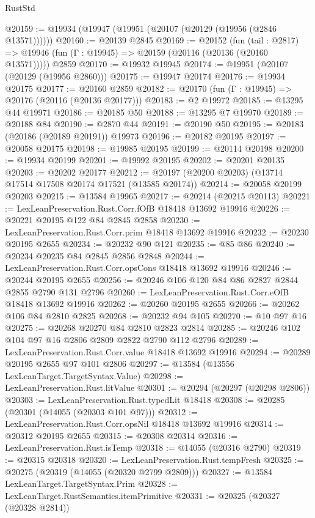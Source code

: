 \begin{lexlean}{RustStd}
\begin{coremodule}
@20159 := @19934 (@19947 (@19951 (@20107 (@20129 (@19956 (@2846 @13571))))))
@20160 := @20139 @2845
@20169 := @20152
    (fun (tail : @2817) => @19946 (fun (Γ : @19945) => @20159 (@20116 (@20136 (@20160 @13571)))))
    @2859
@20170 := @19932 @19945
@20174 := @19951 (@20107 (@20129 (@19956 @2860)))
@20175 := @19947 @20174
@20176 := @19934 @20175
@20177 := @20160 @2859
@20182 := @20170 (fun (Γ : @19945) => @20176 (@20116 (@20136 @20177)))
@20183 := @2 @19972
@20185 := @13295 @44 @19971
@20186 := @20185 @50
@20188 := @13295 @7 @19970
@20189 := @20188 @84
@20190 := @2870 @44
@20191 := @20190 @50
@20195 := @20183 (@20186 (@20189 @20191)) @19973
@20196 := @20182 @20195
@20197 := @20058 @20175
@20198 := @19985 @20195
@20199 := @20114 @20198
@20200 := @19934 @20199
@20201 := @19992 @20195
@20202 := @20201 @20135
@20203 := @20202 @20177
@20212 := @20197 (@20200 @20203) (@13714 @17514 @17508 @20174 @17521 (@13585 @20174))
@20214 := @20058 @20199 @20203
@20215 := @13584 @19965
@20217 := @20214 (@20215 @20113)
@20221 := LexLeanPreservation.Rust.Corr.fOfB @18418 @13692 @19916
@20226 := @20221 @20195 @122 @84 @2845 @2858
@20230 := LexLeanPreservation.Rust.Corr.prim @18418 @13692 @19916
@20232 := @20230 @20195 @2655
@20234 := @20232 @90 @121
@20235 := @85 @86
@20240 := @20234 @20235 @84 @2845 @2856 @2848
@20244 := LexLeanPreservation.Rust.Corr.opsCons @18418 @13692 @19916
@20246 := @20244 @20195 @2655
@20256 := @20246 @106 @120 @84 @86 @2827 @2844 @2855 @2790 @131 @2796
@20260 := LexLeanPreservation.Rust.Corr.eOfB @18418 @13692 @19916
@20262 := @20260 @20195 @2655
@20266 := @20262 @106 @84 @2810 @2825
@20268 := @20232 @94 @105
@20270 := @10 @97 @16
@20275 := @20268 @20270 @84 @2810 @2823 @2814
@20285 := @20246 @102 @104 @97 @16 @2806 @2809 @2822 @2790 @112 @2796
@20289 := LexLeanPreservation.Rust.Corr.value @18418 @13692 @19916
@20294 := @20289 @20195 @2655 @97 @101 @2806
@20297 := @13584 (@13556 LexLeanTarget.TargetSyntax.Value)
@20298 := LexLeanPreservation.Rust.litValue
@20301 := @20294 (@20297 (@20298 @2806))
@20303 := LexLeanPreservation.Rust.typedLit @18418
@20308 := @20285 (@20301 (@14055 (@20303 @101 @97)))
@20312 := LexLeanPreservation.Rust.Corr.opsNil @18418 @13692 @19916
@20314 := @20312 @20195 @2655
@20315 := @20308 @20314
@20316 := LexLeanPreservation.Rust.isTemp
@20318 := @14055 (@20316 @2790)
@20319 := @20315 @20318
@20320 := LexLeanPreservation.Rust.tempFresh
@20325 := @20275 (@20319 (@14055 (@20320 @2799 @2809)))
@20327 := @13584 LexLeanTarget.TargetSyntax.Prim
@20328 := LexLeanTarget.RustSemantics.itemPrimitive
@20331 := @20325 (@20327 (@20328 @2814))

\end{coremodule}
\end{lexlean}
